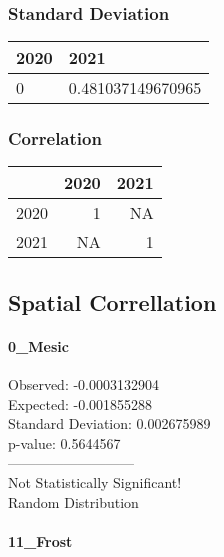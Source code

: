 \documentclass[
]{article}
\begin{document}
\hypertarget{standard-deviation-5}{%
\subsubsection{Standard Deviation}\label{standard-deviation-5}}

\begin{table}[H]
\centering
\begin{tabular}{l|l}
\hline
2020 & 2021\\
\hline
0 & 0.481037149670965\\
\hline
\end{tabular}
\end{table}

\hypertarget{correlation-5}{%
\subsubsection{Correlation}\label{correlation-5}}

\begin{table}[H]
\centering
\begin{tabular}{l|r|r}
\hline
  & 2020 & 2021\\
\hline
2020 & 1 & NA\\
\hline
2021 & NA & 1\\
\hline
\end{tabular}
\end{table}

\hypertarget{spatial-correllation}{%
\subsection{Spatial Correllation}\label{spatial-correllation}}

\hypertarget{mesic}{%
\paragraph{0\_Mesic}\label{mesic}}

Observed: -0.0003132904\\
Expected: -0.001855288\\
Standard Deviation: 0.002675989\\
p-value: 0.5644567\\
---------------------------\\
Not Statistically Significant!\\
Random Distribution

\hypertarget{frost}{%
\paragraph{11\_Frost}\label{frost}}
\end{document}
